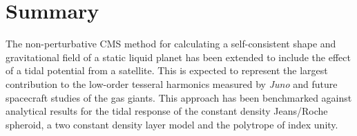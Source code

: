 



\section{Summary} \label{summary}

The non-perturbative CMS method for calculating a self-consistent shape and
gravitational field of a static liquid planet has been extended to include the
effect of a tidal potential from a satellite. This is expected to represent the
largest contribution to the low-order tesseral harmonics measured by
\textit{Juno} and future spacecraft studies of the gas giants. This approach
has been benchmarked against analytical results for the tidal response of the
constant density Jeans/Roche spheroid, a two constant density layer model and
the polytrope of index unity. 

